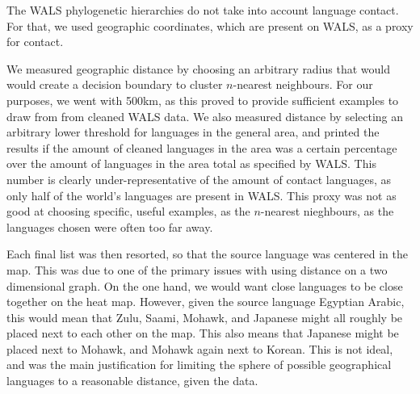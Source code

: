 \documentclass[11pt]{article}
\begin{document}
The WALS phylogenetic hierarchies do not take into account language contact. For that, we used geographic coordinates, which are present on WALS, as a proxy for contact. 

We measured geographic distance by choosing an arbitrary radius that would would create a decision boundary to cluster $n$-nearest neighbours. For our purposes, we went with 500km, as this proved to provide sufficient examples to draw from from cleaned WALS data. We also measured distance by selecting an arbitrary lower threshold for languages in the general area, and printed the results if the amount of cleaned languages in the area was a certain percentage over the amount of languages in the area total as specified by WALS. This number is clearly under-representative of the amount of contact languages, as only half of the world's languages are present in WALS. This proxy was not as good at choosing specific, useful examples, as the $n$-nearest nieghbours, as the languages chosen were often too far away. 




Each final list was then resorted, so that the source language was centered in the map. This was due to one of the primary issues with using distance on a two dimensional graph. On the one hand, we would want close languages to be close together on the heat map. However, given the source language Egyptian Arabic, this would mean that Zulu, Saami, Mohawk, and Japanese might all roughly be placed next to each other on the map. This also means that Japanese might be placed next to Mohawk, and Mohawk again next to Korean. This is not ideal, and was the main justification for limiting the sphere of possible geographical languages to a reasonable distance, given the data. 
\end{document}
